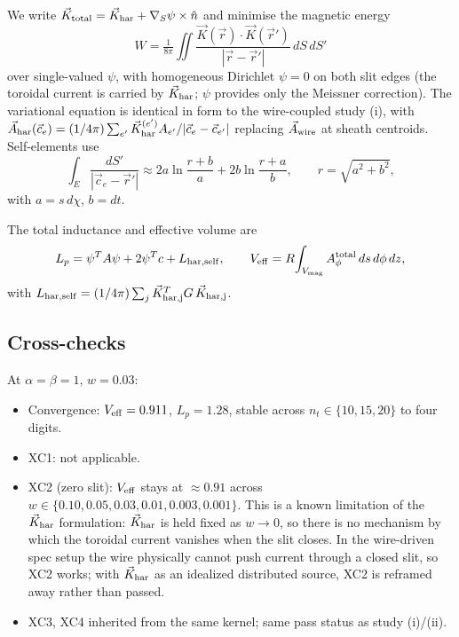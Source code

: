 \documentclass[11pt]{article}
\begin{document}
We write $\vec K_{\rm total}=\vec K_{\rm har}+\nabla_S\psi\times\hat n$
and minimise the magnetic energy
\begin{equation}
W=\tfrac{1}{8\pi}\iint\frac{\vec K(\vec r)\cdot\vec K(\vec r')}
{|\vec r-\vec r'|}\,dS\,dS'
\end{equation}
over single-valued $\psi$, with homogeneous Dirichlet $\psi=0$ on
both slit edges (the toroidal current is carried by
$\vec K_{\rm har}$; $\psi$ provides only the Meissner correction).
The variational equation is identical in form to the wire-coupled
study (i), with $\vec A_{\rm har}(\vec c_e) = (1/4\pi)\sum_{e'}
\vec K_{\rm har}^{(e')} A_{e'}/|\vec c_e-\vec c_{e'}|$ replacing
$\vec A_{\rm wire}$ at sheath centroids.  Self-elements use
\begin{equation}
\int_E\frac{dS'}{|\vec c_e-\vec r'|} \approx 2 a \ln\frac{r+b}{a}
+ 2 b \ln\frac{r+a}{b},
\qquad r=\sqrt{a^2+b^2},
\end{equation}
with $a=s\,d\chi$, $b=dt$.

The total inductance and effective volume are
\begin{equation}
L_p = \psi^T A\psi + 2\psi^T c + L_{\rm har,self},
\qquad
V_{\rm eff} = R\!\int_{V_{\rm mag}}A_\phi^{\rm total}\,ds\,d\phi\,dz,
\end{equation}
with $L_{\rm har,self}=(1/4\pi)\sum_j \vec K_{\rm har,j}^T G\,\vec K_{\rm har,j}$.

\subsection{Cross-checks}

At $\alpha=\beta=1$, $w=0.03$:
\begin{itemize}
\item Convergence: $V_{\rm eff}=0.911$, $L_p=1.28$, stable across
$n_t\in\{10,15,20\}$ to four digits.
\item XC1: not applicable.
\item XC2 (zero slit): $V_{\rm eff}$ stays at $\approx 0.91$ across
$w\in\{0.10,0.05,0.03,0.01,0.003,0.001\}$.  This is a known
limitation of the $\vec K_{\rm har}$ formulation: $\vec K_{\rm har}$
is held fixed as $w\to 0$, so there is no mechanism by which the
toroidal current vanishes when the slit closes.  In the wire-driven
spec setup the wire physically cannot push current through a closed
slit, so XC2 works; with $\vec K_{\rm har}$ as an idealized
distributed source, XC2 is reframed away rather than passed.
\item XC3, XC4 inherited from the same kernel; same pass status as
study (i)/(ii).
\end{itemize}
\end{document}
